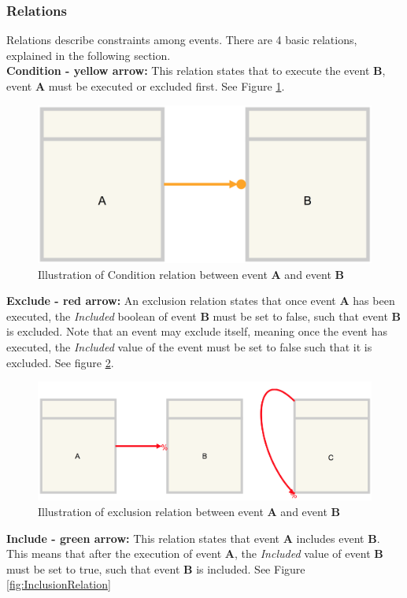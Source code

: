 \subsubsection{Relations}
Relations describe constraints among events. There are 4 basic relations, explained in the following section. \\

\textbf{Condition - yellow arrow:} This relation states that to execute the event \textbf{B}, event \textbf{A} must be executed or excluded first. See Figure \ref{fig:ConditionRelation}.

\begin{figure}[h!]
\centering
\includegraphics[width=0.5\linewidth]{Figures/conditions}
\caption{\label{fig:ConditionRelation} Illustration of Condition relation between event \textbf{A} and event \textbf{B}}
\end{figure} 

\textbf{Exclude - red arrow:} An exclusion relation states that once event \textbf{A} has been executed, the \textit{Included} boolean of event \textbf{B} must be set to false, such that event \textbf{B} is excluded. Note that an event may exclude itself, meaning once the event has executed, the \textit{Included} value of the event must be set to false such that it is excluded.  See figure \ref{fig:ExclusionRelation}.

\begin{figure}[h!]
\centering
\includegraphics[width=0.8\linewidth]{Figures/exclusion}
\caption{\label{fig:ExclusionRelation} Illustration of exclusion relation between event \textbf{A} and event \textbf{B}}
\end{figure} 


\textbf{Include - green arrow:} This relation states that event \textbf{A} includes event \textbf{B}. This means that  after the execution of event \textbf{A}, the \textit{Included} value of event \textbf{B} must be set to true, such that event \textbf{B} is included. See Figure \ref{fig:InclusionRelation}

